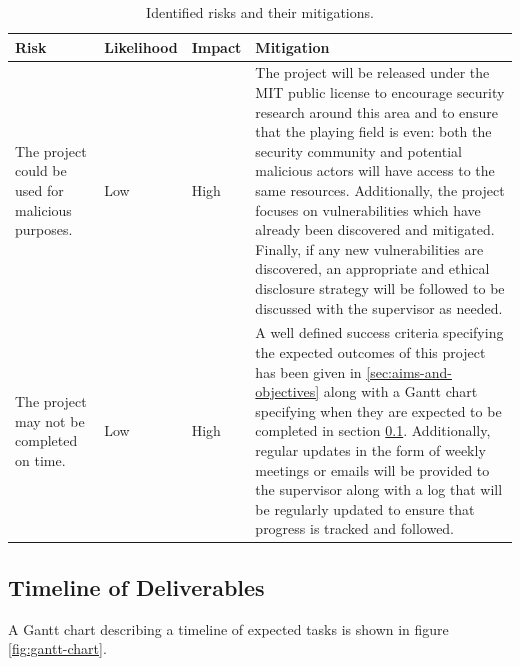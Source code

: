 \documentclass[a4paper,oneside,11pt]{article}
\begin{document}
\begin{table}[h]
	\centering
	\footnotesize

	\begin{tabular}{|p{3cm}|l|l|p{9cm}|}
		\hline
		\textbf{Risk} & \textbf{Likelihood} & \textbf{Impact} &
		\textbf{Mitigation} \\
		\hline
		The project could be used for malicious purposes. & Low & High
		& The project will be released under the MIT public license to
		encourage security research around this area and to ensure that
		the playing field is even: both the security community and
		potential malicious actors will have access to the same
		resources. Additionally, the project focuses on vulnerabilities
		which have already been discovered and mitigated. Finally, if
		any new vulnerabilities are discovered, an appropriate and
		ethical disclosure strategy will be followed to be discussed
		with the supervisor as needed. \\
		\hline
		The project may not be completed on time. & Low & High &
		A well defined success criteria specifying the expected
		outcomes of this project has been given in
		\ref{sec:aims-and-objectives} along with a Gantt chart
		specifying when they are expected to be completed in section
		\ref{sec:timeline-of-deliverables}. Additionally, regular
		updates in the form of weekly meetings or emails will be
		provided to the supervisor along with a log that will be
		regularly updated to ensure that progress is tracked and
		followed. \\
		\hline
	\end{tabular}

	\caption{Identified risks and their mitigations.}
	\label{tbl:risks-mitigations}
\end{table}



\subsection{Timeline of Deliverables}
\label{sec:timeline-of-deliverables}

A Gantt chart describing a timeline of expected tasks is shown in figure
\ref{fig:gantt-chart}.
\end{document}
